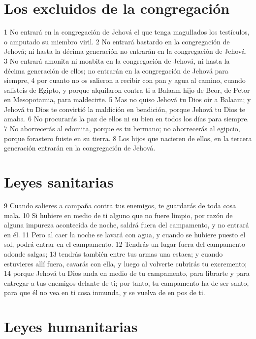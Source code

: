 \section{Los excluidos de la congregación}


1 No entrará en la congregación de Jehová el que tenga magullados los testículos, o amputado su miembro viril.
2 No entrará bastardo en la congregación de Jehová; ni hasta la décima generación no entrarán en la congregación de Jehová.
3 No entrará amonita ni moabita en la congregación de Jehová, ni hasta la décima generación de ellos; no entrarán en la congregación de Jehová para siempre,
4 por cuanto no os salieron a recibir con pan y agua al camino, cuando salisteis de Egipto, y porque alquilaron contra ti a Balaam hijo de Beor, de Petor en Mesopotamia, para maldecirte.
5 Mas no quiso Jehová tu Dios oír a Balaam; y Jehová tu Dios te convirtió la maldición en bendición, porque Jehová tu Dios te amaba.
6 No procurarás la paz de ellos ni su bien en todos los días para siempre.
7 No aborrecerás al edomita, porque es tu hermano; no aborrecerás al egipcio, porque forastero fuiste en su tierra.
8 Los hijos que nacieren de ellos, en la tercera generación entrarán en la congregación de Jehová.

\section{Leyes sanitarias}

9 Cuando salieres a campaña contra tus enemigos, te guardarás de toda cosa mala.
10 Si hubiere en medio de ti alguno que no fuere limpio, por razón de alguna impureza acontecida de noche, saldrá fuera del campamento, y no entrará en él.
11 Pero al caer la noche se lavará con agua, y cuando se hubiere puesto el sol, podrá entrar en el campamento.
12 Tendrás un lugar fuera del campamento adonde salgas;
13 tendrás también entre tus armas una estaca; y cuando estuvieres allí fuera, cavarás con ella, y luego al volverte cubrirás tu excremento;
14 porque Jehová tu Dios anda en medio de tu campamento, para librarte y para entregar a tus enemigos delante de ti; por tanto, tu campamento ha de ser santo, para que él no vea en ti cosa inmunda, y se vuelva de en pos de ti.

\section{Leyes humanitarias}

